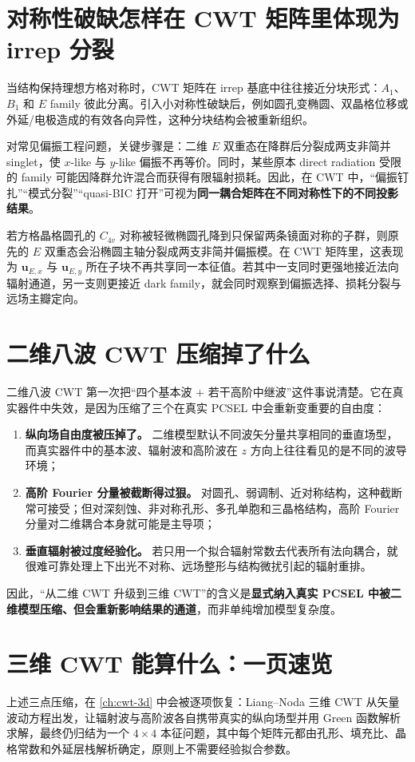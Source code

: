 \section{对称性破缺怎样在 CWT 矩阵里体现为 irrep 分裂}
当结构保持理想方格对称时，CWT 矩阵在 irrep 基底中往往接近分块形式：$A_1$、$B_1$ 和 $E$ family 彼此分离。引入小对称性破缺后，例如圆孔变椭圆、双晶格位移或外延/电极造成的有效各向异性，这种分块结构会被重新组织。

对常见偏振工程问题，关键步骤是：二维 $E$ 双重态在降群后分裂成两支非简并 singlet，使 $x$-like 与 $y$-like 偏振不再等价。同时，某些原本 direct radiation 受限的 family 可能因降群允许混合而获得有限辐射损耗。因此，在 CWT 中，“偏振钉扎”“模式分裂”“quasi-BIC 打开”可视为\textbf{同一耦合矩阵在不同对称性下的不同投影结果}。

若方格晶格圆孔的 $C_{4v}$ 对称被轻微椭圆孔降到只保留两条镜面对称的子群，则原先的 $E$ 双重态会沿椭圆主轴分裂成两支非简并偏振模。在 CWT 矩阵里，这表现为 $\bm{u}_{E,x}$ 与 $\bm{u}_{E,y}$ 所在子块不再共享同一本征值。若其中一支同时更强地接近法向辐射通道，另一支则更接近 dark family，就会同时观察到偏振选择、损耗分裂与远场主瓣定向。

\section{二维八波 CWT 压缩掉了什么}
二维八波 CWT 第一次把“四个基本波 $+$ 若干高阶中继波”这件事说清楚。它在真实器件中失效，是因为压缩了三个在真实 PCSEL 中会重新变重要的自由度：
\begin{enumerate}
  \item \textbf{纵向场自由度被压掉了。} 二维模型默认不同波矢分量共享相同的垂直场型，而真实器件中的基本波、辐射波和高阶波在 $z$ 方向上往往看见的是不同的波导环境；
  \item \textbf{高阶 Fourier 分量被截断得过狠。} 对圆孔、弱调制、近对称结构，这种截断常可接受；但对深刻蚀、非对称孔形、多孔单胞和三晶格结构，高阶 Fourier 分量对二维耦合本身就可能是主导项；
  \item \textbf{垂直辐射被过度经验化。} 若只用一个拟合辐射常数去代表所有法向耦合，就很难可靠处理上下出光不对称、远场整形与结构微扰引起的辐射重排。
\end{enumerate}
因此，“从二维 CWT 升级到三维 CWT”的含义是\textbf{显式纳入真实 PCSEL 中被二维模型压缩、但会重新影响结果的通道}，而非单纯增加模型复杂度。

\section{三维 CWT 能算什么：一页速览}
上述三点压缩，在 \cref{ch:cwt-3d} 中会被逐项恢复：Liang--Noda 三维 CWT 从矢量波动方程出发，让辐射波与高阶波各自携带真实的纵向场型并用 Green 函数解析求解，最终仍归结为一个 $4\times4$ 本征问题，其中每个矩阵元都由孔形、填充比、晶格常数和外延层栈解析确定，原则上不需要经验拟合参数。

